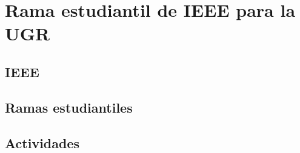 
\section[IEEE SB UGR]{Rama estudiantil de IEEE para la UGR}

\subsection{IEEE}
\begin{frame}
\end{frame}

\subsection{Ramas estudiantiles}
\begin{frame}
\end{frame}

\subsection{Actividades}
\begin{frame}
\end{frame}
